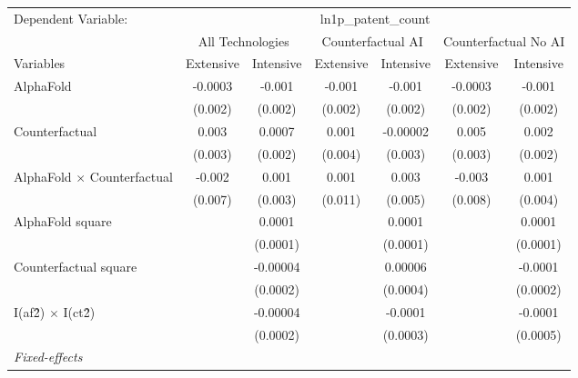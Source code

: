\begingroup
\centering
\begin{tabular}{lcccccc}
   \tabularnewline \midrule \midrule
   Dependent Variable: & \multicolumn{6}{c}{ln1p\_patent\_count}\\
 & \multicolumn{2}{c}{All Technologies} & \multicolumn{2}{c}{Counterfactual AI} & \multicolumn{2}{c}{Counterfactual No AI} \\
\cmidrule(lr){1-1}\cmidrule(lr){2-3} \cmidrule(lr){4-5} \cmidrule(lr){6-7}
Variables & \multicolumn{1}{c}{Extensive} & \multicolumn{1}{c}{Intensive} & \multicolumn{1}{c}{Extensive} & \multicolumn{1}{c}{Intensive} & \multicolumn{1}{c}{Extensive} & \multicolumn{1}{c}{Intensive} \\
\cmidrule(lr){1-1}\cmidrule(lr){2-2} \cmidrule(lr){3-3} \cmidrule(lr){4-4} \cmidrule(lr){5-5} \cmidrule(lr){6-6} \cmidrule(lr){7-7}
   AlphaFold                          & -0.0003 & -0.001   & -0.001  & -0.001   & -0.0003 & -0.001\\   
                                      & (0.002) & (0.002)  & (0.002) & (0.002)  & (0.002) & (0.002)\\   
   Counterfactual                     & 0.003   & 0.0007   & 0.001   & -0.00002 & 0.005   & 0.002\\   
                                      & (0.003) & (0.002)  & (0.004) & (0.003)  & (0.003) & (0.002)\\   
   AlphaFold $\times$ Counterfactual  & -0.002  & 0.001    & 0.001   & 0.003    & -0.003  & 0.001\\   
                                      & (0.007) & (0.003)  & (0.011) & (0.005)  & (0.008) & (0.004)\\   
   AlphaFold square                   &         & 0.0001   &         & 0.0001   &         & 0.0001\\   
                                      &         & (0.0001) &         & (0.0001) &         & (0.0001)\\   
   Counterfactual square              &         & -0.00004 &         & 0.00006  &         & -0.0001\\   
                                      &         & (0.0002) &         & (0.0004) &         & (0.0002)\\   
   I(af\^2) $\times$ I(ct\^2)         &         & -0.00004 &         & -0.0001  &         & -0.0001\\   
                                      &         & (0.0002) &         & (0.0003) &         & (0.0005)\\   
   \midrule
   \emph{Fixed-effects}\\

\end{tabular}

